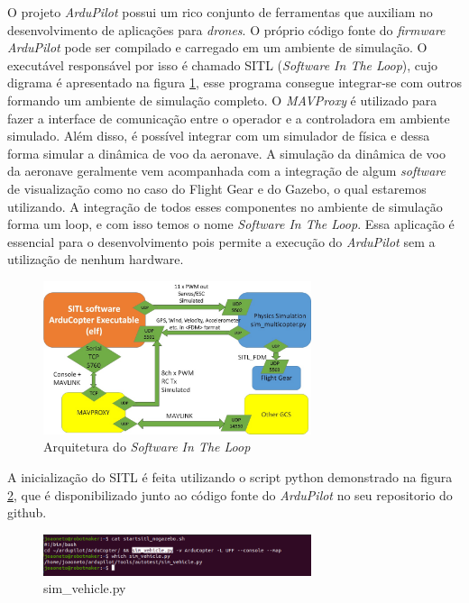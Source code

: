 \documentclass[12pt,a4paper,oneside]{book}
\begin{document}
O projeto \textit{ArduPilot} possui um rico conjunto de ferramentas que auxiliam no desenvolvimento de aplicações para \textit{drones}. O próprio código fonte do \textit{firmware} \textit{ArduPilot} pode ser compilado e carregado em um ambiente de simulação. O executável responsável por isso é chamado SITL (\textit{Software In The Loop}), cujo digrama é apresentado na figura \ref{fig:sitl_arq.jpg.0}, esse programa consegue integrar-se com outros formando um ambiente de simulação completo. O \textit{MAVProxy} é utilizado para fazer a interface de comunicação entre o operador e a controladora em ambiente simulado. Além disso, é possível integrar com um simulador de física e dessa forma simular a dinâmica de voo da aeronave. A simulação da dinâmica de voo da aeronave geralmente vem acompanhada com a integração de algum \textit{software} de visualização como no caso do Flight Gear e do Gazebo, o qual estaremos utilizando. A integração de todos esses componentes no ambiente de simulação forma um loop, e com isso temos o nome \textit{Software In The Loop}. Essa aplicação é essencial para o desenvolvimento pois permite a execução do \textit{ArduPilot} sem a utilização de nenhum hardware.

%
\begin{figure}[H]
  \centering
  \includegraphics[width=0.7\textwidth]{Images/Diagramas/sitl_arq.jpg}
  \caption{Arquitetura do \textit{Software In The Loop}}
  \label{fig:sitl_arq.jpg.0}
\end{figure}
%



A inicialização do SITL é feita utilizando o script python demonstrado na figura \ref{fig:sim_vehicle.png.0}, que é disponibilizado junto ao código fonte do \textit{ArduPilot} no seu repositorio do github.

%
\begin{figure}[H]
  \centering
  \includegraphics[width=0.7\textwidth]{Images/Desenvolvimento/sim_vehicle.png}
  \caption{sim\_vehicle.py}
  \label{fig:sim_vehicle.png.0}
\end{figure}
%
\end{document}
